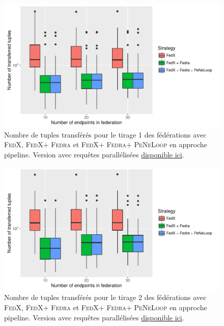 \documentclass[a4paper]{article}
\def\fedra{\textsc{Fedra}\xspace}
\def\fedx{\textsc{FedX}\xspace}
\def\peneloop{\textsc{PeNeLoop}\xspace}
\newcommand{\parallelLink}[1]{Version avec requêtes parallélisées \href{#1}{disponible ici}.}
\begin{document}
\begin{figure}[h]
    \centering
    \includegraphics{boxplots/fed1_transferred_tuples.pdf}
    \caption{Nombre de tuples transférés pour le tirage 1 des fédérations avec \fedx, \fedx + \fedra et \fedx + \fedra + \peneloop en approche pipeline. \parallelLink{https://github.com/Callidon/ParallelNestedLoop/blob/master/results/definitive/fed1_pll_transferred_tuples.pdf}}
    \label{fig:fed1_tuples}
\end{figure}

\begin{figure}[h]
    \centering
    \includegraphics{boxplots/fed2_transferred_tuples.pdf}
    \caption{Nombre de tuples transférés pour le tirage 2 des fédérations avec \fedx, \fedx + \fedra et \fedx + \fedra + \peneloop en approche pipeline. \parallelLink{https://github.com/Callidon/ParallelNestedLoop/blob/master/results/definitive/fed2_pll_transferred_tuples.pdf}}
    \label{fig:fed2_tuples}
\end{figure}
\end{document}
